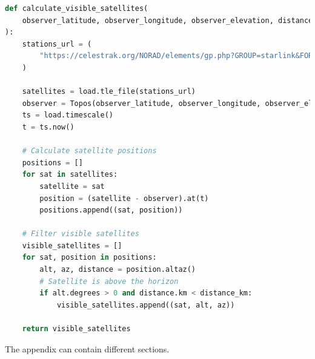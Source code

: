 \documentclass[IN,11pt,twoside,openright,bachelor,english]{tumthesis}
\begin{document}
\begin{lstlisting}[language=python,caption={the \texttt{calculate\_visible\_satellites} function},captionpos=b]
def calculate_visible_satellites(
    observer_latitude, observer_longitude, observer_elevation, distance_km
):
    stations_url = (
        "https://celestrak.org/NORAD/elements/gp.php?GROUP=starlink&FORMAT=tle"
    )

    satellites = load.tle_file(stations_url)
    observer = Topos(observer_latitude, observer_longitude, observer_elevation)
    ts = load.timescale()
    t = ts.now()

    # Calculate satellite positions
    positions = []
    for sat in satellites:
        satellite = sat
        position = (satellite - observer).at(t)
        positions.append((sat, position))

    # Filter visible satellites
    visible_satellites = []
    for sat, position in positions:
        alt, az, distance = position.altaz()
        # Satellite is above the horizon
        if alt.degrees > 0 and distance.km < distance_km:
            visible_satellites.append((sat, alt, az))

    return visible_satellites
\end{lstlisting}

The appendix can contain different sections.

\clearpage
\pagestyle{thesischapter}

\cleardoublepage
{}

\printbibliography[heading=bibintoc]
\clearpage
\pagestyle{empty}
\end{document}
